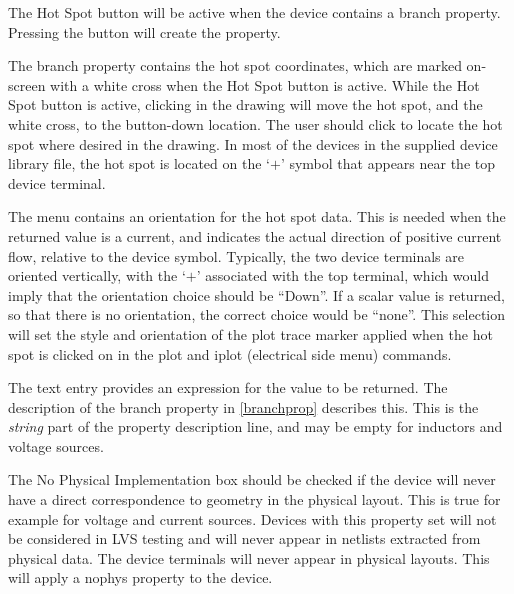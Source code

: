 The {\cb Hot Spot} button will be active when the device contains a
{\et branch} property.  Pressing the button will create the property.

The {\et branch} property contains the hot spot coordinates, which are
marked on-screen with a white cross when the {\cb Hot Spot} button is
active.  While the {\cb Hot Spot} button is active, clicking in the
drawing will move the hot spot, and the white cross, to the
button-down location.  The user should click to locate the hot spot
where desired in the drawing.  In most of the devices in the supplied
device library file, the hot spot is located on the `$+$' symbol that
appears near the top device terminal.

The menu contains an orientation for the hot spot data.  This is
needed when the returned value is a current, and indicates the actual
direction of positive current flow, relative to the device symbol. 
Typically, the two device terminals are oriented vertically, with the
`$+$' associated with the top terminal, which would imply that the
orientation choice should be ``{\cb Down}''.  If a scalar value is
returned, so that there is no orientation, the correct choice would be
``{\cb none}''.  This selection will set the style and orientation of
the plot trace marker applied when the hot spot is clicked on in the
{\cb plot} and {\cb iplot} (electrical side menu) commands.

The text entry provides an expression for the value to be returned. 
The description of the {\et branch} property in \ref{branchprop}
describes this.  This is the {\it string} part of the property
description line, and may be empty for inductors and voltage sources.

The {\cb No Physical Implementation} box should be checked if the
device will never have a direct correspondence to geometry in the
physical layout.  This is true for example for voltage and current
sources.  Devices with this property set will not be considered in LVS
testing and will never appear in netlists extracted from physical
data.  The device terminals will never appear in physical layouts. 
This will apply a {\et nophys} property to the device.


